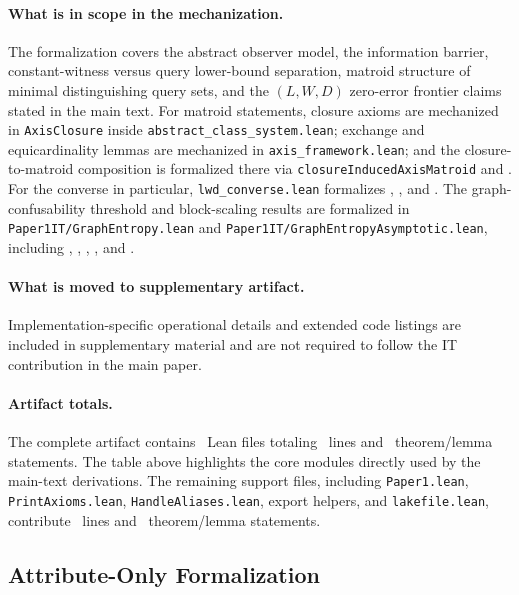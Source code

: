 \paragraph{What is in scope in the mechanization.}
The formalization covers the abstract observer model, the information barrier, constant-witness versus query lower-bound separation, matroid structure of minimal distinguishing query sets, and the $(L,W,D)$ zero-error frontier claims stated in the main text. For matroid statements, closure axioms are mechanized in \nolinkurl{AxisClosure} inside \nolinkurl{abstract_class_system.lean}; exchange and equicardinality lemmas are mechanized in \nolinkurl{axis_framework.lean}; and the closure-to-matroid composition is formalized there via \nolinkurl{closureInducedAxisMatroid} and . For the converse in particular, \nolinkurl{lwd_converse.lean} formalizes , , and . The graph-confusability threshold and block-scaling results are formalized in \nolinkurl{Paper1IT/GraphEntropy.lean} and \nolinkurl{Paper1IT/GraphEntropyAsymptotic.lean}, including , , , , and .

\paragraph{What is moved to supplementary artifact.}
Implementation-specific operational details and extended code listings are included in supplementary material and are not required to follow the IT contribution in the main paper.

\paragraph{Artifact totals.}
The complete artifact contains \LeanTotalFiles\ Lean files totaling \LeanTotalLines\ lines and \LeanTotalTheorems\ theorem/lemma statements. The table above highlights the core modules directly used by the main-text derivations. The remaining support files, including \nolinkurl{Paper1.lean}, \nolinkurl{PrintAxioms.lean}, \nolinkurl{HandleAliases.lean}, export helpers, and \nolinkurl{lakefile.lean}, contribute \LeanLinesSupportFiles\ lines and \LeanTheoremsSupportFiles\ theorem/lemma statements.

\subsection{Attribute-Only Formalization}\label{interface-only-formalization}

